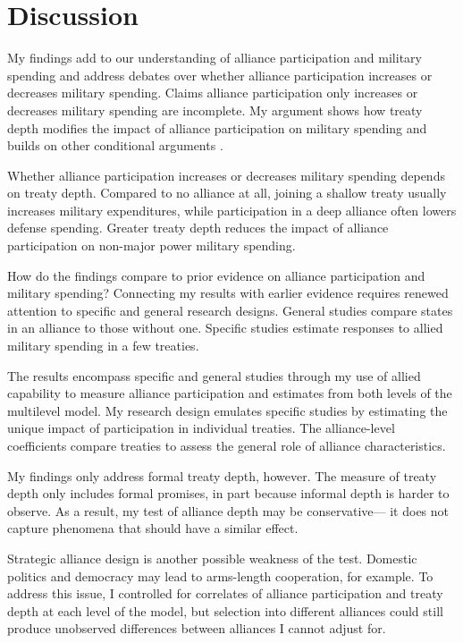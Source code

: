 \documentclass[12pt]{article}
\begin{document}
\section*{Discussion}


My findings add to our understanding of alliance participation and military spending and address debates over whether alliance participation increases or decreases military spending. 
Claims alliance participation only increases or decreases military spending are incomplete. 
My argument shows how treaty depth modifies the impact of alliance participation on military spending and builds on other conditional arguments \citep{DigiuseppePoast2016}. 


Whether alliance participation increases or decreases military spending depends on treaty depth. 
Compared to no alliance at all, joining a shallow treaty usually increases military expenditures, while participation in a deep alliance often lowers defense spending. 
Greater treaty depth reduces the impact of alliance participation on non-major power military spending. 


How do the findings compare to prior evidence on alliance participation and military spending? 
Connecting my results with earlier evidence requires renewed attention to specific and general research designs. 
General studies compare states in an alliance to those without one. 
Specific studies estimate responses to allied military spending in a few treaties. 


The results encompass specific and general studies through my use of allied capability to measure alliance participation and estimates from both levels of the multilevel model. 
My research design emulates specific studies by estimating the unique impact of participation in individual treaties. 
The alliance-level coefficients compare treaties to assess the general role of alliance characteristics.   


My findings only address formal treaty depth, however. 
The measure of treaty depth only includes formal promises, in part because informal depth is harder to observe. 
As a result, my test of alliance depth may be conservative--- it does not capture phenomena that should have a similar effect. 


Strategic alliance design is another possible weakness of the test. 
Domestic politics \citep{Davis2004} and democracy \citep{Chibaetal2015} may lead to arms-length cooperation, for example.   
To address this issue, I controlled for correlates of alliance participation and treaty depth at each level of the model, but selection into different alliances could still produce unobserved differences between alliances I cannot adjust for. 
\end{document}
